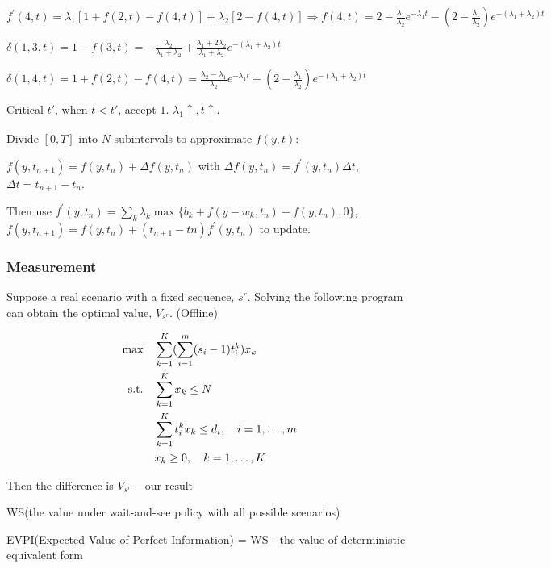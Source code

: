 $f^{\prime}(4, t) = \lambda_1 [1 + f(2,t) - f(4,t)] + \lambda_2 [2 - f(4,t)] \Rightarrow f(4,t) = 2- \frac{\lambda_1}{\lambda_2} e^{-\lambda_1 t} - (2- \frac{\lambda_1}{\lambda_2}) e^{-(\lambda_1 + \lambda_2)t}$

$\delta(1,3,t) = 1- f(3,t) = - \frac{\lambda_2}{\lambda_1 + \lambda_2} + \frac{\lambda_1 + 2 \lambda_2}{\lambda_1 + \lambda_2} e^{-(\lambda_1 + \lambda_2)t}$

$\delta(1,4,t) = 1+ f(2,t) - f(4,t) = \frac{\lambda_2- \lambda_1}{\lambda_2} e^{-\lambda_1 t} + (2- \frac{\lambda_1}{\lambda_2}) e^{-(\lambda_1 + \lambda_2)t}$

Critical $t{'}$, when $t < t{'}$, accept $1$.  $\lambda_1 \uparrow, t \uparrow$.

Divide $[0, T]$ into $N$ subintervals to approximate $f(y,t)$:

$f(y,t_{n+1}) = f(y, t_n) + \Delta f(y, t_n)$ with $\Delta f(y, t_n) = f^{'}(y, t_n) \Delta t$, $\Delta t = t_{n+1} - t_{n}$.

Then use $f^{\prime} (y, t_n) = \sum_k \lambda_k \max\{b_k + f(y-w_k, t_n)- f(y, t_n), 0\}$, $f(y, t_{n+1}) = f(y, t_n) + (t_{n+1} - t{n}) f^{\prime}(y, t_n)$ to update.


\subsubsection{Measurement}

Suppose a real scenario with a fixed sequence, $s^{r}$. Solving the following program can obtain the optimal value, $V_{s^{r}}$. (Offline)

\begin{equation*}
\begin{aligned}
  \mbox{max}\quad & \sum_{k=1}^K(\sum_{i=1}^m (s_i-1)t_i^k) x_{k} \\
  \mbox{s.t.} \quad & \sum_{k=1}^K x_{k} \leq N \\
  & \sum_{k=1}^K t_i^k x_k \leq d_i,\quad i=1,\ldots,m \\
  & x_{k} \geq 0, \quad k = 1,\ldots,K \notag
\end{aligned}
\end{equation*}

Then the difference is $V_{s^{r}} - \text{our result}$

WS(the value under wait-and-see policy with all possible scenarios)

EVPI(Expected Value of Perfect Information) = WS - the value of deterministic equivalent form


